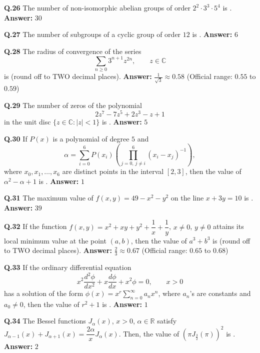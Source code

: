 \documentclass[11pt,a4paper]{article}
\newcommand{\ans}[1]{\textbf{Answer:} #1\par\medskip}
\begin{document}
\textbf{Q.26} The number of non-isomorphic abelian groups of order $2^2 \cdot 3^3 \cdot 5^4$ is \underline{\hspace{2cm}}.
\ans{$30$}

\textbf{Q.27} The number of subgroups of a cyclic group of order $12$ is \underline{\hspace{2cm}}.
\ans{$6$}

\textbf{Q.28} The radius of convergence of the series
\[
  \sum_{n \ge 0} 3^{n+1} z^{2n}, \qquad z \in \mathbb{C}
\]
is \underline{\hspace{2cm}} (round off to TWO decimal places).
\ans{$\frac{1}{\sqrt{3}} \approx 0.58$ (Official range: $0.55$ to $0.59$)}

\textbf{Q.29} The number of zeros of the polynomial
\[
  2z^7 - 7z^5 + 2z^3 - z + 1
\]
in the unit disc $\{z \in \mathbb{C} : |z| < 1\}$ is \underline{\hspace{2cm}}.
\ans{$5$}

\textbf{Q.30} If $P(x)$ is a polynomial of degree $5$ and
\[
  \alpha = \sum_{i=0}^{6} P(x_i) \left(\prod_{j=0,\, j \neq i}^{6} (x_i - x_j)^{-1}\right),
\]
where $x_0, x_1, \dots, x_6$ are distinct points in the interval $[2, 3]$, then the value of $\alpha^2 - \alpha + 1$ is \underline{\hspace{2cm}}.
\ans{$1$}

\textbf{Q.31} The maximum value of $f(x, y) = 49 - x^2 - y^2$ on the line $x + 3y = 10$ is \underline{\hspace{2cm}}.
\ans{$39$}

\textbf{Q.32} If the function $f(x, y) = x^2 + xy + y^2 + \dfrac{1}{x} + \dfrac{1}{y}$, $x \neq 0$, $y \neq 0$ attains its local minimum value at the point $(a, b)$, then the value of $a^3 + b^3$ is \underline{\hspace{2cm}} (round off to TWO decimal places).
\ans{$\frac{2}{3} \approx 0.67$ (Official range: $0.65$ to $0.68$)}

\textbf{Q.33} If the ordinary differential equation
\[
  x^2 \frac{d^2 \phi}{dx^2} + x\frac{d\phi}{dx} + x^2 \phi = 0, \qquad x > 0
\]
has a solution of the form $\phi(x) = x^r \displaystyle\sum_{n=0}^{\infty} a_n x^n$, where $a_n$'s are constants and $a_0 \neq 0$, then the value of $r^2 + 1$ is \underline{\hspace{2cm}}.
\ans{$1$}

\textbf{Q.34} The Bessel functions $J_\alpha(x)$, $x > 0$, $\alpha \in \mathbb{R}$ satisfy $J_{\alpha - 1}(x) + J_{\alpha + 1}(x) = \dfrac{2\alpha}{x} J_\alpha(x)$. Then, the value of $\left(\pi J_{\frac{3}{2}}(\pi)\right)^2$ is \underline{\hspace{2cm}}.
\ans{$2$}
\end{document}
